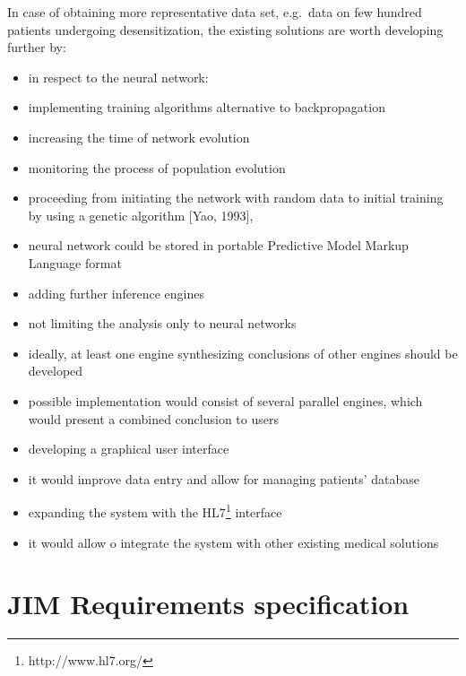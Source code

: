 \documentclass[10pt,oneside]{memoir}
\begin{document}
In case of obtaining more representative data set, e.g.\ data on few hundred patients undergoing desensitization, the existing solutions are worth developing further by:


\begin{itemize}


\item in respect to the neural network:

\item implementing training algorithms alternative to backpropagation

\item increasing the time of network evolution

\item monitoring the process of population evolution

\item proceeding from initiating the network with random data to initial training by using a genetic algorithm [Yao, 1993],

\item neural network could be stored in portable Predictive Model Markup Language format

\item adding further inference engines

\item not limiting the analysis only to neural networks

\item ideally, at least one engine synthesizing conclusions of other engines should be developed

\item possible implementation would consist of several parallel engines, which would present a combined conclusion to users

\item developing a graphical user interface

\item it would improve data entry and allow for managing patients' database

\item expanding the system with the HL7\footnote{http://www.hl7.org/} interface

\item it would allow o integrate the system with other existing medical solutions
\end{itemize}

\part{JIM Requirements specification}
\label{appendixa}
\end{document}

